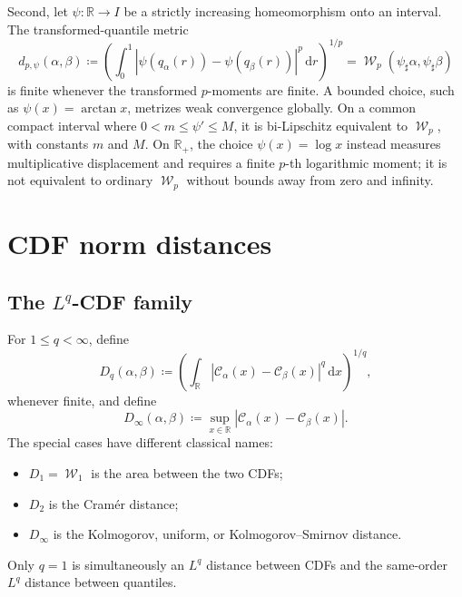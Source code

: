 \documentclass[11pt]{article}
\newcommand{\RR}{\mathbb R}
\renewcommand{\d}{\,\mathrm d}
\newcommand{\al}{\alpha}
\newcommand{\be}{\beta}
\newcommand{\Cc}{\mathcal C}
\newcommand{\cumul}[1]{\Cc_{#1}}
\DeclareMathOperator{\Wass}{\mathcal W}
\newcommand{\eqdef}{\coloneqq}
\begin{document}
Second, let $\psi:\RR\to I$ be a strictly increasing homeomorphism onto an
interval.  The transformed-quantile metric
\begin{equation}\label{eq:transformed-quantile}
 d_{p,\psi}(\al,\be)
 \eqdef\left(\int_0^1
 |\psi(q_\al(r))-\psi(q_\be(r))|^p\d r\right)^{1/p}
 =\Wass_p(\psi_\sharp\al,\psi_\sharp\be)
\end{equation}
is finite whenever the transformed $p$-moments are finite.  A bounded choice,
such as $\psi(x)=\arctan x$, metrizes weak convergence globally.  On a common
compact interval where $0<m\leq\psi'\leq M$, it is bi-Lipschitz equivalent to
$\Wass_p$, with constants $m$ and $M$.  On $\RR_+$, the choice
$\psi(x)=\log x$ instead measures multiplicative displacement and requires a
finite $p$-th logarithmic moment; it is not equivalent to ordinary $\Wass_p$
without bounds away from zero and infinity.

\section{CDF norm distances}

\subsection{The \texorpdfstring{$L^q$}{Lq}-CDF family}

For $1\leq q<\infty$, define
\begin{equation}\label{eq:cdf-lq}
 D_q(\al,\be)
 \eqdef\left(\int_\RR |\cumul{\al}(x)-\cumul{\be}(x)|^q\d x\right)^{1/q},
\end{equation}
whenever finite, and define
\begin{equation}\label{eq:ks}
 D_\infty(\al,\be)
 \eqdef\sup_{x\in\RR}|\cumul{\al}(x)-\cumul{\be}(x)|.
\end{equation}
The special cases have different classical names:
\begin{itemize}[leftmargin=2em]
\item $D_1=\Wass_1$ is the area between the two CDFs;
\item $D_2$ is the Cram\'er distance;
\item $D_\infty$ is the Kolmogorov, uniform, or Kolmogorov--Smirnov distance.
\end{itemize}
Only $q=1$ is simultaneously an $L^q$ distance between CDFs and the same-order
$L^q$ distance between quantiles.
\end{document}
